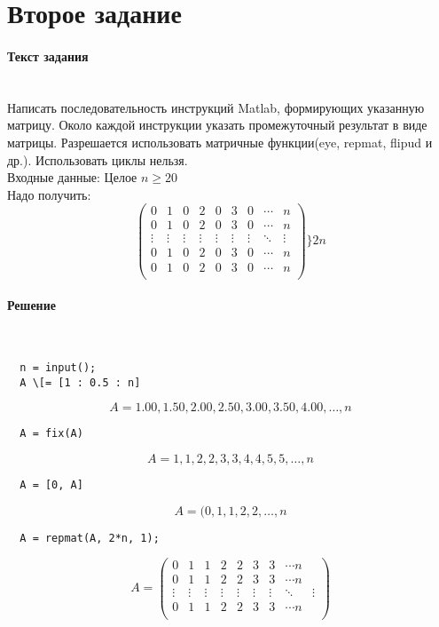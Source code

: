 \section{Второе задание}

\paragraph{Текст задания} ~\\
Написать последовательность инструкций Matlab, формирующих указанную матрицу. Около каждой инструкции указать промежуточный результат в виде матрицы. Разрешается использовать матричные функции(eye, repmat, flipud и др.). Использовать циклы нельзя.\\[1em]
Входные данные: Целое $n \geq 20$\\[1em]
Надо получить:
\[
  \begin{pmatrix}
    0 & 1 & 0 & 2 & 0 & 3 & 0 & \cdots & n \\
    0 & 1 & 0 & 2 & 0 & 3 & 0 & \cdots & n \\
    \vdots & \vdots & \vdots & \vdots & \vdots & \vdots & \vdots & \ddots & \vdots \\
    0 & 1 & 0 & 2 & 0 & 3 & 0 & \cdots & n \\
    0 & 1 & 0 & 2 & 0 & 3 & 0 & \cdots & n \\
  \end{pmatrix}
  \} 2n
\]

\paragraph{Решение} ~\\
\begin{lstlisting}
  n = input();
  A \[= [1 : 0.5 : n]
  \end{lstlisting}
\[A = 1.00, 1.50, 2.00, 2.50, 3.00, 3.50, 4.00, \ldots, n\]

\begin{lstlisting}
  A = fix(A)
\end{lstlisting}
\[A = 1, 1, 2, 2, 3, 3, 4, 4, 5, 5, \ldots, n\]

\begin{lstlisting}
  A = [0, A]
\end{lstlisting}
\[A = (0, 1, 1, 2, 2, \ldots, n\]

\begin{lstlisting}
  A = repmat(A, 2*n, 1);
\end{lstlisting}
\[
  A =
  \begin{pmatrix}
    0 & 1 & 1 & 2 & 2 & 3 & 3 & \cdots n \\
    0 & 1 & 1 & 2 & 2 & 3 & 3 & \cdots n \\
    \vdots & \vdots & \vdots & \vdots & \vdots & \vdots & \vdots & \ddots & \vdots \\
    0 & 1 & 1 & 2 & 2 & 3 & 3 & \cdots n \\
  \end{pmatrix}
\]
